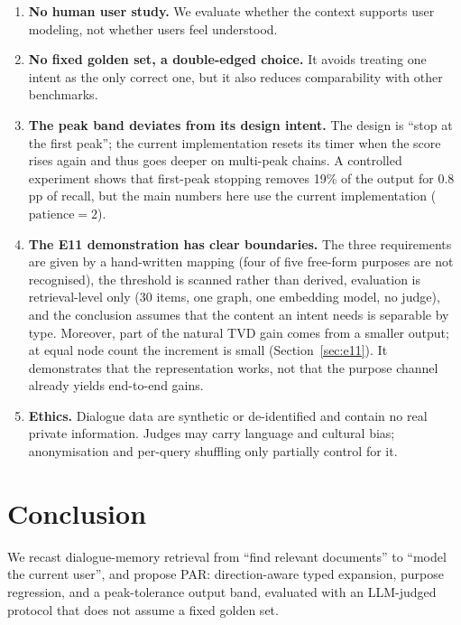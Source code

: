 \documentclass[11pt]{article}
\begin{document}
\begin{enumerate}
        facts''; they are suitable for distribution estimates and case selection, not for precise
        proportions.
  \item \textbf{No human user study.} We evaluate whether the context supports user modeling, not
        whether users feel understood.
  \item \textbf{No fixed golden set, a double-edged choice.} It avoids treating one intent as the
        only correct one, but it also reduces comparability with other benchmarks.
  \item \textbf{The peak band deviates from its design intent.} The design is ``stop at the first
        peak''; the current implementation resets its timer when the score rises again and thus
        goes deeper on multi-peak chains. A controlled experiment shows that first-peak stopping
        removes 19\% of the output for 0.8 pp of recall, but the main numbers here use the current
        implementation ($\text{patience}=2$).
  \item \textbf{The E11 demonstration has clear boundaries.} The three requirements are given by
        a hand-written mapping (four of five free-form purposes are not recognised), the
        threshold is scanned rather than derived, evaluation is retrieval-level only (30 items,
        one graph, one embedding model, no judge), and the conclusion assumes that the content an
        intent needs is separable by type. Moreover, part of the natural TVD gain comes from a
        smaller output; at equal node count the increment is small (Section~\ref{sec:e11}). It
        demonstrates that the representation works, not that the purpose channel already yields
        end-to-end gains.
  \item \textbf{Ethics.} Dialogue data are synthetic or de-identified and contain no real private
        information. Judges may carry language and cultural bias; anonymisation and per-query
        shuffling only partially control for it.
\end{enumerate}

\section{Conclusion}
\label{sec:conclusion}

We recast dialogue-memory retrieval from ``find relevant documents'' to ``model the current
user'', and propose PAR: direction-aware typed expansion, purpose regression, and a
peak-tolerance output band, evaluated with an LLM-judged protocol that does not assume a fixed
golden set.
\end{document}
